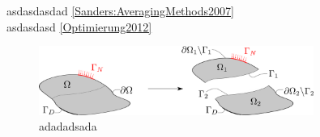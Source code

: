 asdasdasdad \ref{Sanders:AveragingMethods2007}\\
asdasdasd \ref{Optimierung2012}





\begin{figure}[h]
\centering
\includegraphics[width=0.8\textwidth]{./fig/eps/drawing1}
\caption[sssssssss]{adadadsada}\label{fig:reference_problem}
\end{figure}

